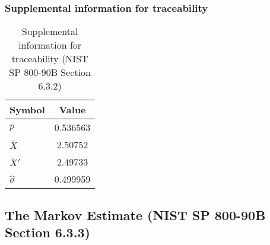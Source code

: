 \documentclass[a3paper,xelatex,english]{bxjsarticle}
\begin{document}
\subsubsection{Supplemental information for traceability}
\renewcommand{\arraystretch}{1.8}
\begin{table}[h]
\caption{Supplemental information for traceability (NIST SP 800-90B Section 6.3.2)}
\begin{center}
\begin{tabular}{|l|c|}
\hline 
\rowcolor{anotherlightblue} %
Symbol				& Value \\ \hline 
$p$				& 0.536563\\ \hline 
$\bar{X}$ 		&  2.50752\\ \hline
$\bar{X}'$		&  2.49733\\ \hline
$\hat{\sigma}$		& 0.499959\\ \hline
\end{tabular}
\end{center}
\end{table}
\renewcommand{\arraystretch}{1.4}
\clearpage
\subsection{The Markov Estimate (NIST SP 800-90B Section 6.3.3)}\label{sec:Binary633}
\end{document}
